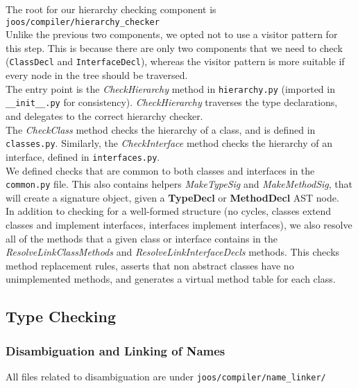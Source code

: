 \documentclass[12pt, a4paper]{article}
\newcommand{\class}{\textbf}
\newcommand{\method}{\textit}
\begin{document}
The root for our hierarchy checking component is \verb|joos/compiler/hierarchy_checker| \\

Unlike the previous two components, we opted not to use a visitor pattern for this step. This is because there are only two components that we need to check (\verb|ClassDecl| and \verb|InterfaceDecl|), whereas the visitor pattern is more suitable if every node in the tree should be traversed. \\

The entry point is the \method{CheckHierarchy} method in \verb|hierarchy.py| (imported in \verb|__init__.py| for consistency). \method{CheckHierarchy} traverses the type declarations, and delegates to the correct hierarchy checker. \\

The \method{CheckClass} method checks the hierarchy of a class, and is defined in \verb|classes.py|. Similarly, the \method{CheckInterface} method checks the hierarchy of an interface, defined in \verb|interfaces.py|. \\

We defined checks that are common to both classes and interfaces in the \verb|common.py| file. This also contains helpers \method{MakeTypeSig} and \method{MakeMethodSig}, that will create a signature object, given a \class{TypeDecl} or \class{MethodDecl} AST node. \\

In addition to checking for a well-formed structure (no cycles, classes extend classes and implement interfaces, interfaces implement interfaces), we also resolve all of the methods that a given class or interface contains in the \method{ResolveLinkClassMethods} and \method{ResolveLinkInterfaceDecls} methods. This checks method replacement rules, asserts that non abstract classes have no unimplemented methods, and generates a virtual method table for each class.


\subsection{Type Checking}

\subsubsection{Disambiguation and Linking of Names}

All files related to disambiguation are under \verb|joos/compiler/name_linker/| \\
\end{document}
